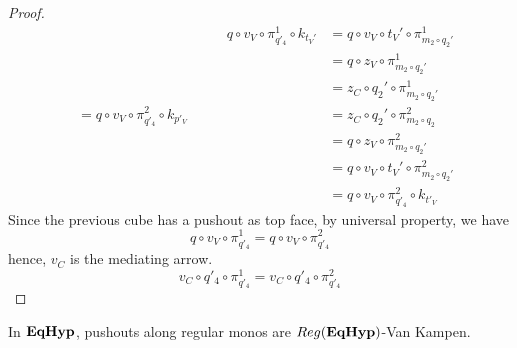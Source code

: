 \documentclass[a4paper,UKenglish,cleveref,pdftex,thm-restate,numberwithinsect]{lipics-v2021}
\newcommand{\catname}[1]{\textbf{\textup{#1}}}
\newcommand{\EqHyp}{\catname{EqHyp}} %
\newcommand{\reg}{\mathsf{Reg}}
\begin{document}
\begin{proof}
\[\begin{split}
		&= q \circ v_V \circ \pi_{q'_4}^2 \circ k_{p'_V}
	\end{split}\qquad\begin{split}
		q \circ v_V \circ \pi_{q'_4}^1 \circ k_{t_V'} &= q \circ v_V \circ t_V' \circ \pi_{m_2 \circ q_2'}^1 \\
		&= q \circ z_V \circ \pi_{m_2 \circ q_2'}^1 \\
		&= z_C \circ q_2' \circ \pi_{m_2 \circ q_2'}^1 \\
		&= z_C \circ q_2' \circ \pi_{m_2 \circ q_2}^2 \\
		&= q \circ z_V \circ \pi_{m_2 \circ q_2'}^2 \\
		&= q \circ v_V \circ t_V' \circ \pi_{m_2 \circ q_2'}^2 \\
		&= q \circ v_V \circ \pi_{q'_4}^2 \circ k_{t'_V}
	\end{split}\]
	Since the previous cube has a pushout as top face, by universal property, we have
	\[
	q \circ v_V \circ \pi_{q'_4}^1 = q \circ v_V \circ \pi_{q'_4}^2
	\]
	hence, $v_C$ is the mediating arrow.
	\[
	v_C \circ q'_4 \circ \pi_{q'_4}^1 = v_C \circ q'_4 \circ \pi_{q'_4}^2
	\]
\end{proof}

\begin{lemma}\label{lemma:van_kampen}
	In $\EqHyp$, pushouts along regular monos are $\reg(\EqHyp)$-Van Kampen.
\end{lemma}
\end{document}
